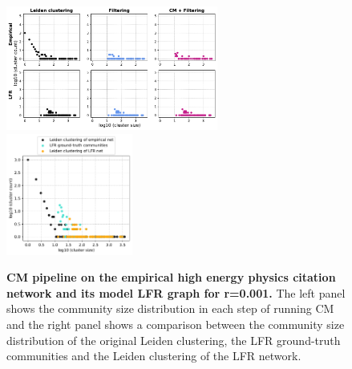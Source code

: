 \documentclass[a4paper]{article}   	%
\begin{document}
\begin{figure}[h!]
\centering
\includegraphics[width=0.62\textwidth]{figs/cit_hepph_cm_steps_lfr001.pdf}
\includegraphics[width=0.37\textwidth]{figs/cit_hepph_001_cm_size.pdf}
\caption[CM pipeline on the empirical high energy physics citation network and its model LFR graph for r=0.001]{\textbf{CM pipeline on the empirical high energy physics citation network and its model LFR graph for r=0.001.} The left panel shows the community size distribution in each step of running CM and the right panel shows a comparison between the community size distribution of the original Leiden clustering, the LFR ground-truth communities and the Leiden clustering of the LFR network.}
\label{fig:hepph-cm-lfr-001}
\end{figure}
\end{document}
